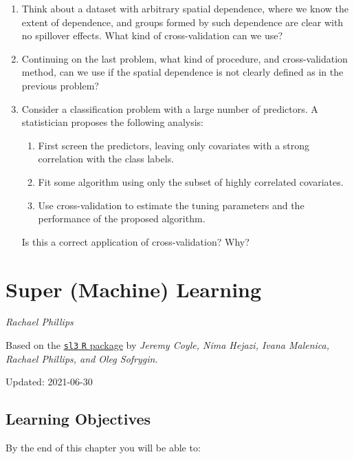 \documentclass[12pt, krantz2,]{krantz}
\newcommand{\passthrough}[1]{#1}
\providecommand{\tightlist}{%
  \setlength{\itemsep}{0pt}\setlength{\parskip}{0pt}}
\theoremstyle{definition}
\theoremstyle{definition}
\theoremstyle{definition}
\newcommand{\1}{\mathbbm{1}}
\begin{document}
\begin{enumerate}
\def\labelenumi{\arabic{enumi}.}
\item
  Think about a dataset with arbitrary spatial dependence, where we know
  the extent of dependence, and groups formed by such dependence are clear
  with no spillover effects. What kind of cross-validation can we use?
\item
  Continuing on the last problem, what kind of procedure, and cross-validation
  method, can we use if the spatial dependence is not clearly defined as in the
  previous problem?
\item
  Consider a classification problem with a large number of predictors. A
  statistician proposes the following analysis:

  \begin{enumerate}
  \def\labelenumii{\alph{enumii}.}
  \tightlist
  \item
    First screen the predictors, leaving only covariates with a strong
    correlation with the class labels.
  \item
    Fit some algorithm using only the subset of highly correlated covariates.
  \item
    Use cross-validation to estimate the tuning parameters and the performance
    of the proposed algorithm.
  \end{enumerate}

  Is this a correct application of cross-validation? Why?
\end{enumerate}

\hypertarget{sl3}{%
\chapter{Super (Machine) Learning}\label{sl3}}

\emph{Rachael Phillips}

Based on the \href{https://github.com/tlverse/sl3}{\passthrough{\lstinline!sl3!} \passthrough{\lstinline!R!} package} by \emph{Jeremy
Coyle, Nima Hejazi, Ivana Malenica, Rachael Phillips, and Oleg Sofrygin}.

Updated: 2021-06-30

\hypertarget{learning-objectives}{%
\section*{Learning Objectives}\label{learning-objectives}}


By the end of this chapter you will be able to:
\end{document}
